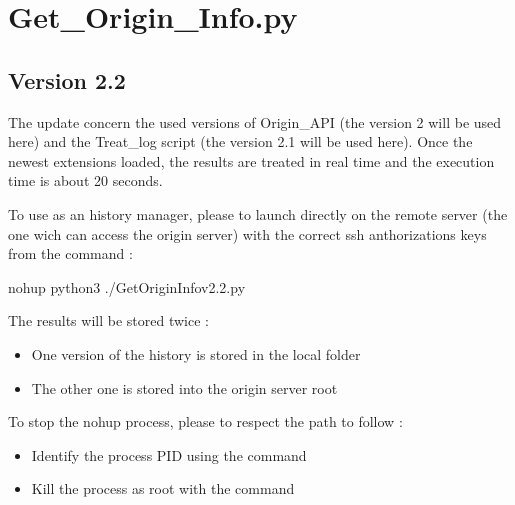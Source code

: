 \documentclass[letterpaper,10pt,english]{sphinxmanual}
\begin{document}
\sphinxstepscope


\chapter{Get\_Origin\_Info.py}
\label{\detokenize{Get_Origin_Info:get-origin-info-py}}\label{\detokenize{Get_Origin_Info::doc}}
\newpage
\section{Version 2.2}
\label{\detokenize{Get_Origin_Info:version-2-2}}
\sphinxAtStartPar
The update concern the used versions of Origin\_API (the version 2 will be used here) and the Treat\_log script (the version 2.1 will be used here).
Once the newest extensions loaded, the results are treated in real time and the execution time is about 20 seconds.

\sphinxAtStartPar
To use as an history manager, please to launch directly on the remote server (the one wich can access the origin server) with the correct ssh anthorizations keys from the command :

\begin{sphinxVerbatim}[commandchars=\\\{\}]
nohup python3 ./Get\PYGZus{}Origin\PYGZus{}Info\PYGZus{}v2.2.py
\end{sphinxVerbatim}

\sphinxAtStartPar
The results will be stored twice :
\begin{itemize}
\item {} 
\sphinxAtStartPar
One version of the history is stored in the local folder

\item {} 
\sphinxAtStartPar
The other one is stored into the origin server root

\end{itemize}

\sphinxAtStartPar
To stop the nohup process, please to respect the path to follow :
\begin{itemize}
\item {} 
\sphinxAtStartPar
Identify the process PID using the command 

\item {} 
\sphinxAtStartPar
Kill the process as root with the command 

\end{itemize}
\end{document}
